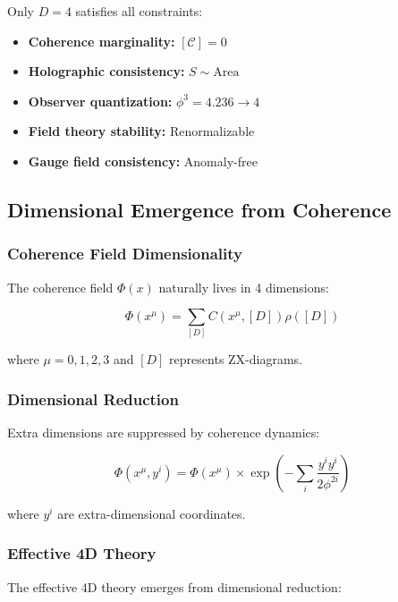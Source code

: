\documentclass[11pt]{article}
\theoremstyle{definition}
\newcommand{\goldenratio}{\phi}
\newcommand{\coherence}{\mathcal{C}}
\newcommand{\density}{\rho}
\begin{document}
Only $D = 4$ satisfies all constraints:
\begin{itemize}
\item \textbf{Coherence marginality:} $[\coherence] = 0$
\item \textbf{Holographic consistency:} $S \sim \text{Area}$
\item \textbf{Observer quantization:} $\goldenratio^3 = 4.236 \to 4$
\item \textbf{Field theory stability:} Renormalizable
\item \textbf{Gauge field consistency:} Anomaly-free
\end{itemize}

\subsection{Dimensional Emergence from Coherence}

\subsubsection{Coherence Field Dimensionality}

The coherence field $\Phi(x)$ naturally lives in 4 dimensions:

\begin{equation}
\Phi(x^\mu) = \sum_{[D]} C(x^\mu, [D]) \density([D])
\end{equation}

where $\mu = 0, 1, 2, 3$ and $[D]$ represents ZX-diagrams.

\subsubsection{Dimensional Reduction}

Extra dimensions are suppressed by coherence dynamics:

\begin{equation}
\Phi(x^\mu, y^i) = \Phi(x^\mu) \times \exp\left(-\sum_i \frac{y^i y^i}{2\goldenratio^{2i}}\right)
\end{equation}

where $y^i$ are extra-dimensional coordinates.

\subsubsection{Effective 4D Theory}

The effective 4D theory emerges from dimensional reduction:
\end{document}
